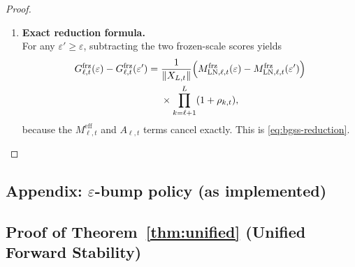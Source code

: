 \documentclass[twoside]{article}
\makeatletter
\newenvironment{algorithmH}{%
  \par\begingroup\@twocolumnfalse\begin{algorithm}[H]
}{%
  \end{algorithm}\endgroup\par
}
\theoremstyle{definition}
\theoremstyle{remark}
\makeatother
\begin{document}
\begin{proof}
\begin{enumerate}
  \item \textbf{Exact reduction formula.}\\
  For any $\varepsilon'\ge \varepsilon$, subtracting the two frozen-scale scores yields
  \[
  \begin{split}
  G_{\ell,t}^{\mathrm{frz}}(\varepsilon) - G_{\ell,t}^{\mathrm{frz}}(\varepsilon')
  =\;&
  \frac{1}{\|X_{L,t}\|}
  \Bigl(
  M_{\mathrm{LN},\ell,t}^{\mathrm{frz}}(\varepsilon)
  -
  M_{\mathrm{LN},\ell,t}^{\mathrm{frz}}(\varepsilon')
  \Bigr)
  \\
  &\times
  \prod_{k=\ell+1}^{L}(1+\rho_{k,t}),
  \end{split}
  \]
  because the $M^{\mathrm{eff}}_{\ell,t}$ and $A_{\ell,t}$ terms cancel exactly. This is
  \eqref{eq:bgss-reduction}.
\end{enumerate}
\end{proof}

\subsection*{Appendix: $\varepsilon$-bump policy (as implemented)}
\begin{algorithmH}
\caption{LayerNorm $\varepsilon$-bump triggered by the practical regime indicator}
\label{alg:eps-bump}
\DontPrintSemicolon
{}
\end{algorithmH}

\subsection{Proof of Theorem~\ref{thm:unified} (Unified Forward Stability)}
\label{app:unified-proof}
\end{document}
